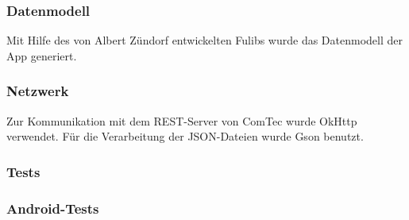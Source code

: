 \subsubsection{Datenmodell} \label{subsubsec:model-libraries}
Mit Hilfe des von Albert Zündorf entwickelten Fulibs wurde das Datenmodell der App generiert.

\subsubsection{Netzwerk} \label{subsubsec:network-libraries}
Zur Kommunikation mit dem REST-Server von ComTec wurde OkHttp verwendet.
Für die Verarbeitung der JSON-Dateien wurde Gson benutzt.

\subsubsection{Tests} \label{subsubsec:tests-libraries}

\subsubsection{Android-Tests} \label{subsubsec:android-tests-libraries}
